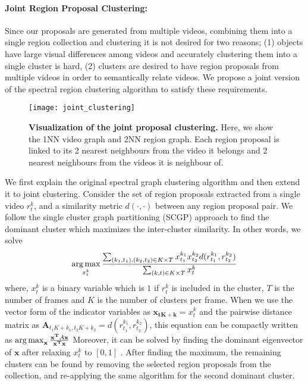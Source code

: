 \paragraph{Joint Region Proposal Clustering:} Since our proposals are generated from multiple videos, combining them into a single region collection and clustering it is not desired for two reasons; (1) objects have large visual differences among videos and accurately clustering them into a single cluster is hard, (2) clusters are desired to have region proposals from multiple videos in order to semantically relate videos. We propose a joint version of the spectral region clustering algorithm to satisfy these requirements.

\begin{figure}[ht]
  \texttt{[image: joint\_clustering]}
  \caption{\textbf{Visualization of the joint proposal clustering.} Here, we show the 1NN video graph and 2NN region graph. Each region proposal is linked to its 2 nearest neighbours from the video it belongs and 2 nearest neighbours from the videos it is neighbour of.}
  \label{hierProposal}
\end{figure}

We first explain the original spectral graph clustering algorithm and then extend it to joint clustering. Consider the set of region proposals extracted from a single video $r^k_t$, and a similarity metric $d(\cdot,\cdot)$ between any region proposal pair. We follow the single cluster graph partitioning (SCGP)\cite{scgp} approach to find the dominant cluster which maximizes the inter-cluster similarity. In other words, we solve
\begin{equation}
  \operatorname*{arg\,max}_{x^k_t} \frac{\sum_{(k_1,t_1),(k_2,t_2) \in K \times T} x^{k_1}_{t_1} x^{k_2}_{t_2} d(r^{k_1}_{t_1},r^{k_2}_{t_2})}{\sum_{(k,t) \in K \times T} x^{k}_t}
\end{equation}
where, $x^{k}_t$ is a binary variable which is $1$ if $r^{k}_t$ is included in the cluster, $T$ is the number of frames and $K$ is the number of clusters per frame. When we use the vector form of the indicator variables as $\mathbf{x_{tK+k}}=x^{k}_{t}$ and the pairwise distance matrix as $\mathbf{A}_{t_1K+k_1,t_2K+k_2}=d(r^{k_1}_{t_1},r^{k_2}_{t_2})$, this equation can be compactly written as
$\operatorname*{arg\,max}_{\mathbf{x}} \frac{\mathbf{x^T}A\mathbf{x}}{\mathbf{x^T}\mathbf{x}}$
Moreover, it can be solved by finding the dominant eigenvector of $\mathbf{x}$ after relaxing $x^{k}_t$ to $[0,1]$ \cite{scgp,scgp_eigen}. After finding the maximum, the remaining clusters can be found by removing the selected region proposals from the collection, and re-applying the same algorithm for the second dominant cluster.

